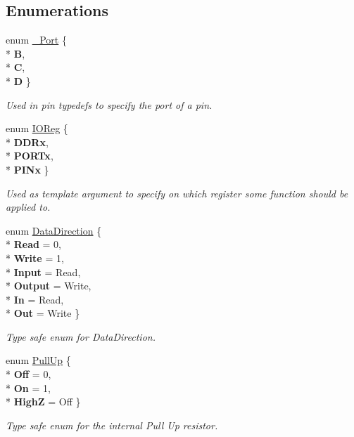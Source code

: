 \subsection*{Enumerations}
\begin{DoxyCompactItemize}
\item 
enum \hyperlink{namespaceports_a9949317f344930bd6ad1097e80c97b67}{\+\_\+\+Port} \{ \\*
{\bfseries B}, 
\\*
{\bfseries C}, 
\\*
{\bfseries D}
 \}\begin{DoxyCompactList}\small\item\em Used in pin {\ttfamily typedef}s to specify the port of a pin. \end{DoxyCompactList}
\item 
enum \hyperlink{namespaceports_aca1f1af9f1af73e71c6954b7dfb1bfa1}{I\+O\+Reg} \{ \\*
{\bfseries D\+D\+Rx}, 
\\*
{\bfseries P\+O\+R\+Tx}, 
\\*
{\bfseries P\+I\+Nx}
 \}\hypertarget{namespaceports_aca1f1af9f1af73e71c6954b7dfb1bfa1}{}\label{namespaceports_aca1f1af9f1af73e71c6954b7dfb1bfa1}
\begin{DoxyCompactList}\small\item\em Used as template argument to specify on which register some function should be applied to. \end{DoxyCompactList}
\item 
enum \hyperlink{namespaceports_a46987e78fa447129742fadda5eccafb4}{Data\+Direction} \{ \\*
{\bfseries Read} = 0, 
\\*
{\bfseries Write} = 1, 
\\*
{\bfseries Input} = Read, 
\\*
{\bfseries Output} = Write, 
\\*
{\bfseries In} = Read, 
\\*
{\bfseries Out} = Write
 \}\begin{DoxyCompactList}\small\item\em Type safe enum for Data\+Direction. \end{DoxyCompactList}
\item 
enum \hyperlink{namespaceports_a49bf0ccedb4cfed89a328574e53bec07}{Pull\+Up} \{ \\*
{\bfseries Off} = 0, 
\\*
{\bfseries On} = 1, 
\\*
{\bfseries HighZ} = Off
 \}\begin{DoxyCompactList}\small\item\em Type safe enum for the internal Pull Up resistor. \end{DoxyCompactList}
\end{DoxyCompactItemize}
